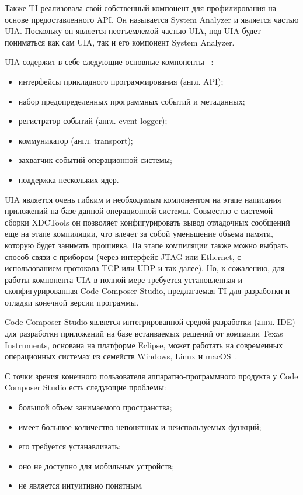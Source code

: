 Также TI реализовала свой собственный компонент для профилирования
на основе предоставленного API.
Он называется System Analyzer и является частью UIA.
Поскольку он является неотъемлемой частью UIA, под UIA будет пониматься
как сам UIA, так и его компонент System Analyzer.

UIA содержит в себе следующие основные компоненты ~\cite{sys_analyzer_doc}:
\begin{itemize}
    \item интерфейсы прикладного программирования (англ. API);
    \item набор предопределенных программных событий и метаданных;
    \item регистратор событий (англ. event logger);
    \item коммуникатор (англ. transport);
    \item захватчик событий операционной системы;
    \item поддержка нескольких ядер.
\end{itemize}


UIA является очень гибким и необходимым компонентом на этапе написания
приложений на базе данной операционной системы. Совместно с системой сборки
XDCTools он позволяет конфигурировать вывод отладочных сообщений еще на этапе
компиляции, что влечет за собой уменьшение объема памяти, которую будет
занимать прошивка. На этапе компиляции также можно выбрать способ связи с
прибором (через интерфейс JTAG или Ethernet, с использованием протокола TCP или
UDP и так далее). Но, к сожалению, для работы компонента UIA в полной мере
требуется установленная и сконфигурированная Code Composer Studio,
предлагаемая TI для разработки и отладки конечной версии программы.

Code Composer Studio является интегрированной средой разработки (англ. IDE)
для разработки приложений на базе встаиваемых решений от компании Texas Instruments,
основана на платформе Eclipse, может работать на современных
операционных системах из семейств Windows, Linux и
macOS~\cite{ccs_ti_site}.%

С точки зрения конечного пользователя аппаратно-программного продукта
у Code Composer Studio есть следующие проблемы:
\begin{itemize}
    \item большой объем занимаемого пространства;
    \item имеет большое количество непонятных и неиспользуемых функций;
    \item его требуется устанавливать;
    \item оно не доступно для мобильных устройств;
    \item не является интуитивно понятным.
\end{itemize}

